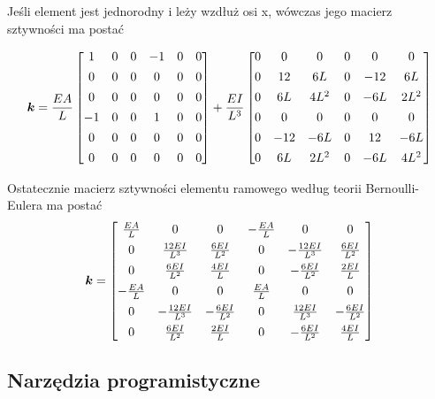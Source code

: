 Jeśli element jest jednorodny i leży wzdłuż osi x, wówczas jego macierz sztywności ma postać

\begin{equation}
\label{eq:adadssssad}
\boldsymbol{k} =
    \frac{EA}{L}
    \begin{bmatrix}
        1 & 0 & 0 & -1 & 0 & 0 \\[1ex]
        0 & 0 & 0 & 0 & 0 & 0 \\[1ex]
        0 & 0 & 0 & 0 & 0 & 0 \\[1ex]
        -1 & 0 & 0 & 1 & 0 & 0 \\[1ex]
        0 & 0 & 0 & 0 & 0 & 0 \\[1ex]
        0 & 0 & 0 & 0 & 0 & 0
    \end{bmatrix}
    +\frac{EI}{L^3}
    \begin{bmatrix}
        0 & 0 & 0 & 0 & 0 & 0 \\[1ex]
        0 & 12 & 6L & 0 & -12 & 6L \\[1ex]
        0 & 6L & 4L^2 & 0 & -6L & 2L^2 \\[1ex]
        0 & 0 & 0 & 0 & 0 & 0 \\[1ex]
        0 & -12 & -6L & 0 & 12 & -6L \\[1ex]
        0 & 6L & 2L^2 & 0 & -6L & 4L^2 \\
    \end{bmatrix}
\end{equation}

Ostatecznie macierz sztywności elementu ramowego według teorii Bernoulli-Eulera ma postać
\begin{equation}
\label{eq:adadad}
\boldsymbol{k} =
    \begin{bmatrix}
        \frac{EA}{L} & 0 & 0 & -\frac{EA}{L} & 0 & 0 \\[1ex]
        0 & \frac{12EI}{L^3} & \frac{6EI}{L^2} & 0 & -\frac{12EI}{L^3} & \frac{6EI}{L^2} \\[1ex]
        0 & \frac{6EI}{L^2} & \frac{4EI}{L} & 0 & -\frac{6EI}{L^2} & \frac{2EI}{L} \\[1ex]
        -\frac{EA}{L} & 0 & 0 & \frac{EA}{L} & 0 & 0 \\[1ex]
        0 & -\frac{12EI}{L^3} & -\frac{6EI}{L^2} & 0 & \frac{12EI}{L^3} & -\frac{6EI}{L^{2}} \\[1ex]
        0 & \frac{6EI}{L^2} & \frac{2EI}{L} & 0 & -\frac{6EI}{L^2} & \frac{4EI}{L}
    \end{bmatrix}
\end{equation}

\subsection{Narzędzia programistyczne}
